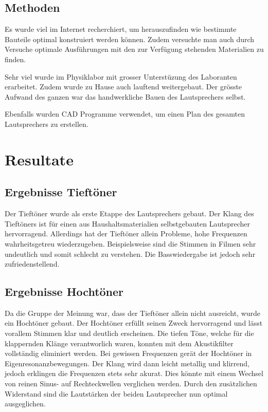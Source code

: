 \documentclass[a4paper,11pt]{report}
\begin{document}
\section{Methoden}
Es wurde viel im Internet recherchiert, um herauszufinden wie bestimmte Bauteile optimal konstruiert werden können. Zudem versuchte man auch durch Versuche optimale Ausführungen mit den zur Verfügung stehenden Materialien zu finden.

Sehr viel wurde im Physiklabor mit grosser Unterstüzung des Laboranten erarbeitet. Zudem wurde zu Hause auch lauftend weitergebaut. Der grösste Aufwand des ganzen war das handwerkliche Bauen des Lautsprechers selbst.

Ebenfalls wurden CAD Programme verwendet, um einen Plan des gesamten Lautsprechers zu erstellen.

\chapter{Resultate}

\section{Ergebnisse Tieftöner}
Der Tieftöner wurde als erste Etappe des Lautsprechers gebaut. Der Klang des Tieftöners ist für einen aus Haushaltsmaterialien selbstgebauten Lautsprecher hervorragend. Allerdings hat der Tieftöner allein Probleme, hohe Frequenzen wahrheitsgetreu wiederzugeben. Beispielsweise sind die Stimmen in Filmen sehr undeutlich und somit schlecht zu verstehen. Die Basswiedergabe ist jedoch sehr zufriedenstellend.

\section{Ergebnisse Hochtöner}
Da die Gruppe der Meinung war, dass der Tieftöner allein nicht ausreicht, wurde ein Hochtöner gebaut. Der Hochtöner erfüllt seinen Zweck hervorragend und lässt vorallem Stimmen klar und deutlich erscheinen. Die tiefen Töne, welche für die klappernden Klänge verantworlich waren, konnten mit dem Akustikfilter vollständig eliminiert werden. Bei gewissen Frequenzen gerät der Hochtöner in Eigenresonanzbewegungen. Der Klang wird dann leicht metallig und klirrend, jedoch erklingen die Frequenzen stets sehr akurat. Dies könnte mit einem Wechsel von reinen Sinus- auf Rechteckwellen verglichen werden. Durch den zusätzlichen Widerstand sind die Lautstärken der beiden Lautsprecher nun optimal ausgeglichen.
\end{document}
